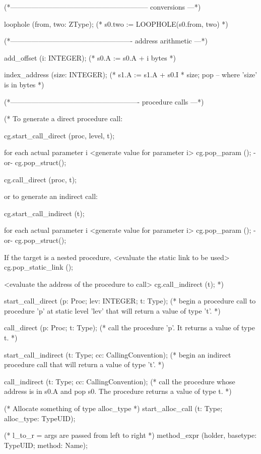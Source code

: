 {(*----------------------------------------------------------- conversions ---*)

loophole (from, two: ZType);
(* s0.two := LOOPHOLE(s0.from, two) *)

(*---------------------------------------------------- address arithmetic ---*)

add_offset (i: INTEGER);
(* s0.A := s0.A + i bytes *)

index_address (size: INTEGER);
(* s1.A := s1.A + s0.I * size; pop  -- where 'size' is in bytes *)

(*------------------------------------------------------- procedure calls ---*)

(* To generate a direct procedure call:
    
      cg.start_call_direct (proc, level, t);
    
      for each actual parameter i
          <generate value for parameter i>
          cg.pop_param ();  -or-  cg.pop_struct();
        
      cg.call_direct (proc, t);

   or to generate an indirect call:

      cg.start_call_indirect (t);
    
      for each actual parameter i
          <generate value for parameter i>
          cg.pop_param ();  -or-  cg.pop_struct();

      If the target is a nested procedure,
          <evaluate the static link to be used>
          cg.pop_static_link ();

      <evaluate the address of the procedure to call>
      cg.call_indirect (t);
*)

start_call_direct (p: Proc;  lev: INTEGER;  t: Type);
(* begin a procedure call to procedure 'p' at static level 'lev' that
   will return a value of type 't'. *)

call_direct (p: Proc;  t: Type);
(* call the procedure 'p'.  It returns a value of type t. *)

start_call_indirect (t: Type;  cc: CallingConvention);
(* begin an indirect procedure call that will return a value of type 't'. *)

call_indirect (t: Type;  cc: CallingConvention);
(* call the procedure whose address is in s0.A and pop s0.  The
   procedure returns a value of type t. *)

(* Allocate something of type alloc_type *)
start_alloc_call (t: Type; alloc_type: TypeUID);

(* l_to_r = args are passed from left to right *)
method_expr (holder, basetype: TypeUID; method: Name);

}

